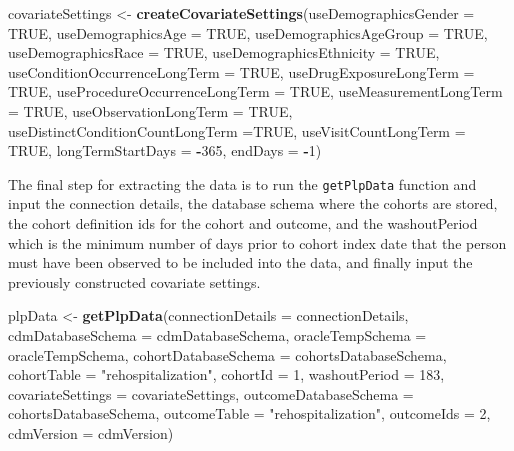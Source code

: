 \documentclass[]{article}
\newenvironment{Shaded}{\begin{snugshade}}{\end{snugshade}}
\newcommand{\KeywordTok}[1]{\textcolor[rgb]{0.13,0.29,0.53}{\textbf{#1}}}
\newcommand{\DataTypeTok}[1]{\textcolor[rgb]{0.13,0.29,0.53}{#1}}
\newcommand{\DecValTok}[1]{\textcolor[rgb]{0.00,0.00,0.81}{#1}}
\newcommand{\StringTok}[1]{\textcolor[rgb]{0.31,0.60,0.02}{#1}}
\newcommand{\OtherTok}[1]{\textcolor[rgb]{0.56,0.35,0.01}{#1}}
\newcommand{\OperatorTok}[1]{\textcolor[rgb]{0.81,0.36,0.00}{\textbf{#1}}}
\newcommand{\NormalTok}[1]{#1}
\begin{document}
\begin{Shaded}
\begin{Highlighting}[]
\NormalTok{covariateSettings <-}\StringTok{ }\KeywordTok{createCovariateSettings}\NormalTok{(}\DataTypeTok{useDemographicsGender =} \OtherTok{TRUE}\NormalTok{,}
\DataTypeTok{useDemographicsAge =} \OtherTok{TRUE}\NormalTok{, }\DataTypeTok{useDemographicsAgeGroup =} \OtherTok{TRUE}\NormalTok{,}
\DataTypeTok{useDemographicsRace =} \OtherTok{TRUE}\NormalTok{, }\DataTypeTok{useDemographicsEthnicity =} \OtherTok{TRUE}\NormalTok{,}
\DataTypeTok{useConditionOccurrenceLongTerm =} \OtherTok{TRUE}\NormalTok{,}
\DataTypeTok{useDrugExposureLongTerm =} \OtherTok{TRUE}\NormalTok{,}
\DataTypeTok{useProcedureOccurrenceLongTerm =} \OtherTok{TRUE}\NormalTok{,}
\DataTypeTok{useMeasurementLongTerm =} \OtherTok{TRUE}\NormalTok{,}
\DataTypeTok{useObservationLongTerm =} \OtherTok{TRUE}\NormalTok{,}
\DataTypeTok{useDistinctConditionCountLongTerm =}\OtherTok{TRUE}\NormalTok{,}
\DataTypeTok{useVisitCountLongTerm =} \OtherTok{TRUE}\NormalTok{, }
\DataTypeTok{longTermStartDays =} \OperatorTok{-}\DecValTok{365}\NormalTok{,}
\DataTypeTok{endDays =} \OperatorTok{-}\DecValTok{1}\NormalTok{)}
\end{Highlighting}
\end{Shaded}

The final step for extracting the data is to run the \texttt{getPlpData}
function and input the connection details, the database schema where the
cohorts are stored, the cohort definition ids for the cohort and
outcome, and the washoutPeriod which is the minimum number of days prior
to cohort index date that the person must have been observed to be
included into the data, and finally input the previously constructed
covariate settings.

\begin{Shaded}
\begin{Highlighting}[]
\NormalTok{plpData <-}\StringTok{ }\KeywordTok{getPlpData}\NormalTok{(}\DataTypeTok{connectionDetails =}\NormalTok{ connectionDetails,}
\DataTypeTok{cdmDatabaseSchema =}\NormalTok{ cdmDatabaseSchema,}
\DataTypeTok{oracleTempSchema =}\NormalTok{ oracleTempSchema,}
\DataTypeTok{cohortDatabaseSchema =}\NormalTok{ cohortsDatabaseSchema,}
\DataTypeTok{cohortTable =} \StringTok{"rehospitalization"}\NormalTok{,}
\DataTypeTok{cohortId =} \DecValTok{1}\NormalTok{,}
\DataTypeTok{washoutPeriod =} \DecValTok{183}\NormalTok{,}
\DataTypeTok{covariateSettings =}\NormalTok{ covariateSettings,}
\DataTypeTok{outcomeDatabaseSchema =}\NormalTok{ cohortsDatabaseSchema,}
\DataTypeTok{outcomeTable =} \StringTok{"rehospitalization"}\NormalTok{,}
\DataTypeTok{outcomeIds =} \DecValTok{2}\NormalTok{,}
\DataTypeTok{cdmVersion =}\NormalTok{ cdmVersion)}
\end{Highlighting}
\end{Shaded}
\end{document}

